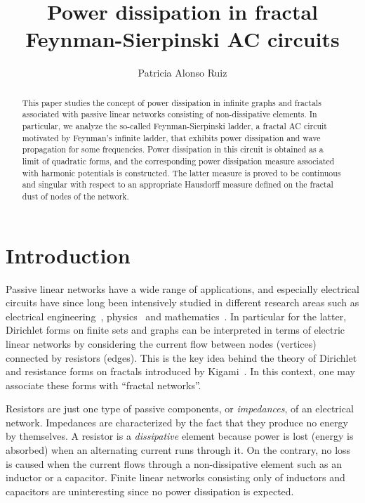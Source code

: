 \documentclass[11pt]{amsart}
\title{Power dissipation in fractal Feynman-Sierpinski AC circuits}
\author{Patricia Alonso Ruiz}
\theoremstyle{definition}
\theoremstyle{remark}
\theoremstyle{example}
\numberwithin{equation}{section}
\begin{document}
	
\begin{abstract}
This paper studies the concept of power dissipation in infinite graphs and fractals associated with passive linear networks consisting of non-dissipative elements. In particular, we analyze the so-called Feynman-Sierpinski ladder, a fractal AC circuit motivated by Feynman's infinite ladder, that exhibits power dissipation and wave propagation for some frequencies. Power dissipation in this circuit is obtained as a limit of quadratic forms, and the corresponding power dissipation measure associated with harmonic potentials is constructed. The latter measure is proved to be continuous and singular with respect to an appropriate Hausdorff measure defined on the fractal dust of nodes of the network.
\end{abstract}
\maketitle
\section{Introduction}
Passive linear networks have a wide range of applications, and especially electrical circuits have since long been intensively studied in different research areas such as electrical engineering~\cite{AV73,Bud74}, physics~\cite{Bru31,BD49} and mathematics~\cite{Wey23,Sma72}. In particular for the latter, Dirichlet forms on finite sets and graphs can be interpreted in terms of electric linear networks by considering the current flow between nodes (vertices) connected by resistors (edges). This is the key idea behind the theory of Dirichlet and resistance forms on fractals introduced by Kigami~\cite{Kig01}. In this context, one may associate these forms with ``fractal networks''.

\medskip

Resistors are just one type of passive components, or \textit{impedances}, of an electrical network. Impedances are characterized by the fact that they produce no energy by themselves. A resistor is a \textit{dissipative} element because power is lost (energy is absorbed) when an alternating current runs through it. On the contrary, no loss is caused when the current flows through a non-dissipative element such as an inductor or a capacitor. Finite linear networks consisting only of inductors and capacitors are uninteresting since no power dissipation is expected.

\medskip
\end{document}
